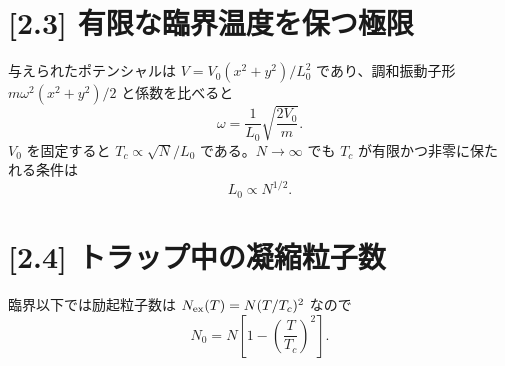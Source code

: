 \documentclass[11pt,a4paper]{article}
\begin{document}
\newpage
\section*{[2.3] 有限な臨界温度を保つ極限}
与えられたポテンシャルは
$V=V_0(x^2+y^2)/L_0^2$ であり、調和振動子形
$m\omega^2(x^2+y^2)/2$ と係数を比べると
\begin{equation}
 \omega=\frac{1}{L_0}\sqrt{\frac{2V_0}{m}}.
\end{equation}
$V_0$ を固定すると $T_c\propto\sqrt N/L_0$ である。$N\to\infty$ でも
$T_c$ が有限かつ非零に保たれる条件は
\begin{equation}
 \boxed{L_0\propto N^{1/2}}.
\end{equation}

\section*{[2.4] トラップ中の凝縮粒子数}
臨界以下では励起粒子数は $N_{\rm ex}(T)=N(T/T_c)^2$ なので
\begin{equation}
 \boxed{N_0=N\left[1-\left(\frac{T}{T_c}\right)^2\right]}.
\end{equation}
\end{document}
